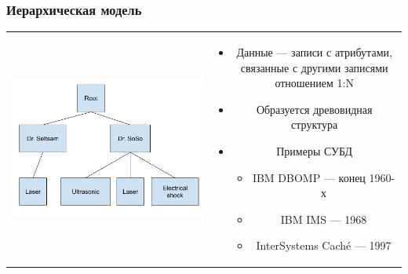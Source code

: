 \documentclass[aspectratio=169]{beamer}
\begin{document}
\begin{frame}[fragile]
  \transwipe[direction=90]
  \frametitle{Иерархическая модель}
  
  \begin{tabular}{c c}
    \begin{minipage}{.4\textwidth}
      \includegraphics[width=\linewidth]{pictures/Hierarchical_model.pdf}
    \end{minipage}
    &
    \begin{minipage}{.55\textwidth}
      \begin{itemize}
        \item Данные --- записи с атрибутами, связанные с другими записями отношением 1:N
        \item Образуется древовидная структура
        \item Примеры СУБД
          \begin{itemize}
            \item IBM DBOMP --- конец 1960-х
            \item IBM IMS --- 1968
            \item InterSystems Caché --- 1997
          \end{itemize}
      \end{itemize}
    \end{minipage}
  \end{tabular}
\end{frame}
\end{document}
